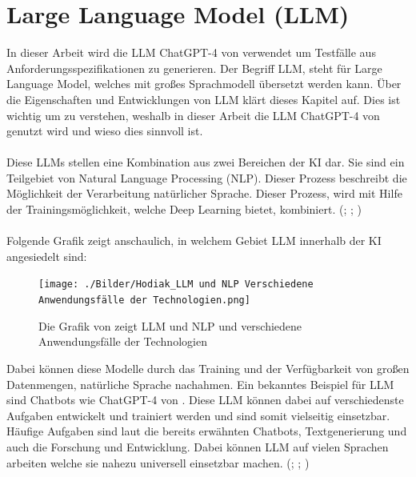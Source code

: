 \documentclass[12pt,toc=bib,toc=listof]{scrreprt}
\begin{document}
\section{Large Language Model (LLM)} %
\label{sec:llm}
In dieser Arbeit wird die LLM ChatGPT-4 von \textcite{OpenAI2025} verwendet um Testfälle aus Anforderungsspezifikationen zu generieren. Der Begriff LLM, steht für Large Language Model, welches mit großes Sprachmodell übersetzt werden kann. Über die Eigenschaften und Entwicklungen von LLM klärt dieses Kapitel auf. Dies ist wichtig um zu verstehen, weshalb in dieser Arbeit die LLM ChatGPT-4 von \textcite{OpenAI2025} genutzt wird und wieso dies sinnvoll ist.\\
\\
Diese LLMs stellen eine Kombination aus zwei Bereichen der KI dar. Sie sind ein Teilgebiet von Natural Language Processing (NLP). Dieser Prozess beschreibt die Möglichkeit der Verarbeitung natürlicher Sprache. Dieser Prozess, wird mit Hilfe der Trainingsmöglichkeit, welche Deep Learning bietet, kombiniert. (\cite{Chang2023}; \cite{Kaddour2023}; \cite{Naveed2024})\\
\\
Folgende Grafik zeigt anschaulich, in welchem Gebiet LLM innerhalb der KI angesiedelt sind:

\begin{figure} [H]
    \centering
    \texttt{[image: ./Bilder/Hodiak\_LLM und NLP Verschiedene Anwendungsfälle der Technologien.png]}
    \caption{Die Grafik von \textcite{Hodiak2024} zeigt LLM und NLP und  verschiedene Anwendungsfälle der Technologien}
    \label{fig:enter-label}
\end{figure}
\noindent Dabei können diese Modelle durch das Training und der Verfügbarkeit von großen Datenmengen, natürliche Sprache nachahmen. Ein bekanntes Beispiel für LLM sind Chatbots wie ChatGPT-4 von \textcite{OpenAI2025}. Diese LLM können dabei auf verschiedenste Aufgaben entwickelt und trainiert werden und sind somit vielseitig einsetzbar. Häufige Aufgaben sind laut \textcite{Kerner2024} die bereits erwähnten Chatbots, Textgenerierung und auch die Forschung und Entwicklung. Dabei können LLM auf vielen Sprachen arbeiten welche sie nahezu universell einsetzbar machen. (\cite{Chang2023}; \cite{Kaddour2023}; \cite{Naveed2024})
\end{document}
